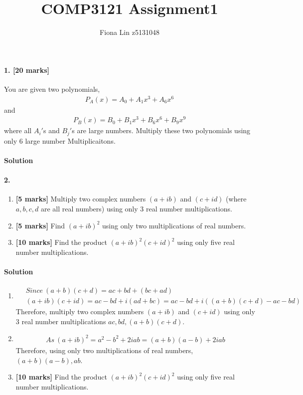\documentclass[a4paper]{scrartcl}
\title{COMP3121 Assignment1}
\author{Fiona Lin z5131048}
\begin{document}
\maketitle

\paragraph{1. [20 marks]}
\label{sec:Question 1}
You are given two polynomials,
\begin{align*}
  P_A(x) = A_0 + A_1x^3+A_6x^6
\end{align*}
and
\begin{align*}
  P_B(x) = B_0 + B_1x^3+B_6x^6+B_9x^9
\end{align*}
where all $A_i'$s and $B_j'$s are large numbers. Multiply these two polynomials using only 6 large number Multiplicaitons.
\paragraph{Solution}




\paragraph{2.}
\label{sec:Question 2}
\begin{enumerate}[label=(\alph*)]
  \item {\bfseries[5 marks]} Multiply two complex numbers $(a + ib)$ and $(c + id)$ (where $a, b, c, d$ are all real numbers) using only 3 real number multiplications.
  \item {\bfseries[5 marks]} Find $(a + ib)^2$ using only two multiplications of real numbers.
  \item {\bfseries[10 marks]} Find the product $(a + ib)^2(c + id)^2$ using only five real number multiplications.
\end{enumerate}

\paragraph{Solution}
\begin{enumerate}[label=(\alph*)]
  \item 
  \begin{align*}
    &\ Since\ (a + b)(c + d) = ac + bd + (bc + ad)\\ &\
   (a + ib)(c + id)=ac - bd + i(ad+bc) =ac - bd + i((a+b)(c+d)-ac-bd)
  \end{align*}
  Therefore, multiply two complex numbers $(a + ib)$ and $(c + id)$ using only 3 real number multiplications $ac, bd, (a + b)(c + d)$.
  \item
  \begin{align*}
    As\ (a + ib)^2=a^2 -b^2 + 2iab =(a+b)(a-b) + 2iab
   \end{align*}
   Therefore, using only two multiplications of real numbers,$(a+b)(a-b)  ,ab$.
  \item {\bfseries[10 marks]} Find the product $(a + ib)^2(c + id)^2$ using only five real number multiplications.
\end{enumerate}
\end{document}
